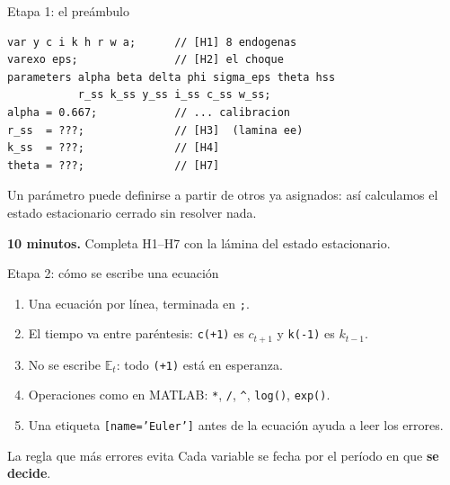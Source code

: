 \begin{frame}[fragile,label=etapa1]{Etapa 1: el preámbulo}
  \begin{lstlisting}
var y c i k h r w a;      // [H1] 8 endogenas
varexo eps;               // [H2] el choque
parameters alpha beta delta phi sigma_eps theta hss
           r_ss k_ss y_ss i_ss c_ss w_ss;
alpha = 0.667;            // ... calibracion
r_ss  = ???;              // [H3]  (lamina ee)
k_ss  = ???;              // [H4]
theta = ???;              // [H7]
\end{lstlisting}
  \vspace{0.2cm}
  Un parámetro puede definirse a partir de otros ya asignados: así calculamos el estado
  estacionario cerrado sin resolver nada.\par
  \vspace{0.25cm}
  \textbf{10 minutos.} Completa H1--H7 con la lámina del estado estacionario.
\end{frame}

\begin{frame}[label=reglas]{Etapa 2: cómo se escribe una ecuación}
  \begin{enumerate}
    \item Una ecuación por línea, terminada en \texttt{;}.\par\vspace{0.12cm}
    \item El tiempo va entre paréntesis: \texttt{c(+1)} es $c_{t+1}$ y \texttt{k(-1)} es
      $k_{t-1}$.\par\vspace{0.12cm}
    \item No se escribe $\mathbb{E}_t$: todo \texttt{(+1)} está en esperanza.\par\vspace{0.12cm}
    \item Operaciones como en MATLAB: \texttt{*}, \texttt{/}, \texttt{\^{}},
      \texttt{log()}, \texttt{exp()}.\par\vspace{0.12cm}
    \item Una etiqueta \texttt{[name='Euler']} antes de la ecuación ayuda a leer los
      errores.
  \end{enumerate}
  \vspace{0.3cm}
  \begin{block}{La regla que más errores evita}
    Cada variable se fecha por el período en que \textbf{se decide}.
  \end{block}
\end{frame}

